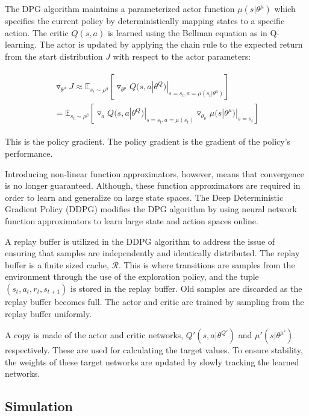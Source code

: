 \documentclass[conference]{IEEEtran}
\begin{document}
The DPG algorithm maintains a parameterized actor function $\mu(s|\theta^\mu)$ which specifies the current policy by deterministically mapping states to a specific action. The critic $Q(s,a)$ is learned using the Bellman equation as in Q-learning. The actor is updated by applying the chain rule to the expected return from the start distribution $J$ with respect to the actor parameters:

\begin{align}
\begin{split}
	\triangledown_{\theta^\mu}J\approx\mathbb{E}_{s_t\sim\rho^\beta}[\triangledown_{\theta^\mu}Q(s,a|\theta^Q)|_{s=s_t,a=\mu(s_t|\theta^\mu)}] \\
	= \mathbb{E}_{s_t\sim\rho^\beta}[\triangledown_aQ(s,a|\theta^Q)|_{s=s_t,a=\mu(s_t)}\triangledown_{\theta_\mu}\mu(s|\theta^\mu)|_{s=s_t}]
\end{split}
\end{align}
  
This is the policy gradient. The policy gradient is the gradient of the policy's performance. 

Introducing non-linear function approximators, however, means that convergence is no longer guaranteed. Although, these function approximators are required in order to learn and generalize on large state spaces. The Deep Deterministic Gradient Policy (DDPG) modifies the DPG algorithm by using neural network function approximators to learn large state and action spaces online.

A replay buffer is utilized in the DDPG algorithm to address the issue of ensuring that samples are independently and identically distributed. The replay buffer is a finite sized cache, $\mathcal{R}$. This is where transitions are samples from the environment through the use of the exploration policy, and the tuple $(s_t,a_t,r_t,s_{t+1})$ is stored in the replay buffer. Old samples are discarded as the replay buffer becomes full. The actor and critic are trained by sampling from the replay buffer uniformly. 

A copy is made of the actor and critic networks, $Q'(s,a|\theta^{Q'})$ and $\mu'(s|\theta^{\mu'})$ respectively. These are used for calculating the target values. To ensure stability, the weights of these target networks are updated by slowly tracking the learned networks.

\subsection{Simulation}
\end{document}
